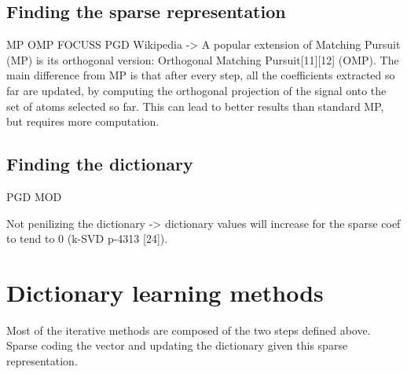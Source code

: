 \documentclass[a4paper,11pt]{article}
\begin{document}
\subsection{Finding the sparse representation}
MP OMP FOCUSS \cite{gorodnitsky97} PGD
Wikipedia -> A popular extension of Matching Pursuit (MP) is its orthogonal version: Orthogonal Matching Pursuit[11][12] (OMP). The main difference from MP is that after every step, all the coefficients extracted so far are updated, by computing the orthogonal projection of the signal onto the set of atoms selected so far. This can lead to better results than standard MP, but requires more computation.
\subsection{Finding the dictionary}
PGD MOD

Not penilizing the dictionary -> dictionary values will increase for the sparse coef to tend to 0
\cite{olshausen97} (k-SVD p-4313 [24]).
\section{Dictionary learning methods}
Most of the iterative methods are composed of the two steps defined above.
Sparse coding the vector and updating the dictionary given this sparse representation.
\end{document}
